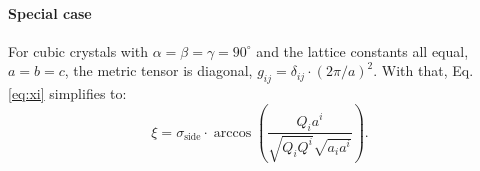 \paragraph*{Special case}
For cubic crystals with $\alpha = \beta = \gamma = 90^{\circ}$ and the lattice constants all equal, $a = b = c$, the metric tensor is diagonal, $g_{ij} = \delta_{ij} \cdot \left( 2\pi / a \right)^2$.
With that, Eq. \ref{eq:xi} simplifies to:
\begin{equation}
	\xi = \sigma_{\mathrm{side}} \cdot \arccos \left( \frac{ Q_i a^i }{ \sqrt{Q_i Q^i} \sqrt{a_i a^i} } \right).
\end{equation}
